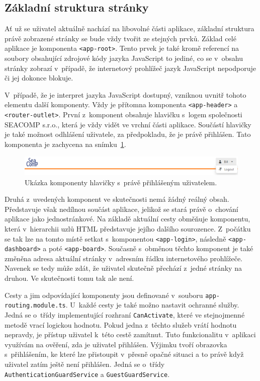 \subsection{Základní struktura stránky}
Ať už se uživatel aktuálně nachází na libovolné části aplikace, základní struktura právě zobrazené stránky se bude vždy tvořit ze stejných prvků. Základ celé aplikace je komponenta \texttt{<app-root>}. Tento prvek je také kromě referencí na soubory obsahující zdrojové kódy jazyka JavaScript to jediné, co se v~obsahu stránky zobrazí v~případě, že internetový prohlížeč jazyk JavaScript nepodporuje či jej dokonce blokuje. 

V~případě, že je interpret jazyka JavaScript dostupný, vzniknou uvnitř tohoto elementu další komponenty. Vždy je přítomna komponenta \texttt{<app-header>} a \texttt{<router-outlet>}. První z~komponent obsahuje hlavičku s~logem společnosti SEACOMP s.r.o., která je vždy vidět ve vrchní části aplikace. Součástí hlavičky je také možnost odhlášení uživatele, za předpokladu, že je právě přihlášen. Tato komponenta je zachycena na snímku~\ref{img:comp-header}.


\begin{figure}[H]
	\centering
	\label{img:comp-header}
	\includegraphics[width=\textwidth]{obrazky-figures/comp-header.png}
	\caption{Ukázka komponenty hlavičky s~právě přihlášeným uživatelem.}
\end{figure}

Druhá z~uvedených komponent ve skutečnosti nemá žádný reálný obsah. Představuje však nedílnou součást aplikace, jelikož se stará právě o~chování aplikace jako jednostránkové. Na základě aktuální cesty obměňuje komponentu, která v~hierarchii uzlů HTML představuje jejího dalšího sourozence. Z~počátku se tak lze na tomto místě setkat s~komponentou \texttt{<app-login>}, následně \texttt{<app-dashboard>} a poté \texttt{<app-board>}. Současně s~obměnou těchto komponent je také změněna adresa aktuální stránky v~adresním řádku internetového prohlížeče. Navenek se tedy může zdát, že uživatel skutečně přechází z~jedné stránky na druhou. Ve skutečnosti tomu tak ale není.

Cesty a jim odpovídající komponenty jsou definované v~souboru \texttt{app-routing.module.ts}. U~každé cesty je také možno nastavit ochranné služby. Jedná se o~třídy implementující rozhraní \texttt{CanActivate}, které ve stejnojmenné metodě vrací logickou hodnotu. Pokud jedna z~těchto služeb vrátí hodnotu nepravdy, je přístup uživatel k~této cestě zamítnut. Tuto funkcionalitu v~aplikaci využívám na ověření, zda je uživatel přihlášen. Výjimku tvoří obrazovka s~přihlášením, ke které lze přistoupit v~přesně opačné situaci a to právě když uživatel zatím ještě není přihlášen. Jedná se o~třídy \texttt{AuthenticationGuardService} a \texttt{GuestGuardService}.


